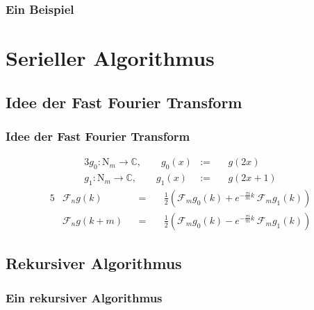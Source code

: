 \documentclass[aspectratio=169]{beamer}
\newcommand{\curvb}[1]{\left( #1 \right)}
\newcommand{\SC}{\mathds{C}} %
\newcommand{\FF}{\mathcal{F}} %
\begin{document}
			\begin{frame}
			\frametitle{Ein Beispiel}
				\begin{figure}
					\center
					
				\end{figure}
			\end{frame}
		


	\section{Serieller Algorithmus} %
	\label{sec:serieller_algorithmus}
	
		\subsection{Idee der Fast Fourier Transform} %
		\label{sub:idee_der_fast_fourier_transform}

			\againframe{dft}

			\begin{frame}
				\frametitle{Idee der Fast Fourier Transform}
				\begin{tcolorbox}[title=Rekursionsformeln der DFT]
					\begin{alignat*}{3}
						g_0:\mathrm{N}_m\longrightarrow\SC,\qquad g_0(x) &:=&& \ g(2x) \\
						g_1:\mathrm{N}_m\longrightarrow\SC,\qquad g_1(x) &:=&& \ g(2x+1)
					\end{alignat*}
					\begin{alignat*}{5}
						&\FF_n g(k) &&=&& \ \frac{1}{2}\curvb{\FF_m g_0(k) + e^{-\frac{\pi i}{m}k} \ \FF_m g_1(k)} \\
						&\FF_n g(k+m) &&=&& \ \frac{1}{2}\curvb{\FF_m g_0(k) - e^{-\frac{\pi i}{m}k} \ \FF_m g_1(k)}
					\end{alignat*}
				\end{tcolorbox}
			\end{frame}


		\subsection{Rekursiver Algorithmus} %
		\label{sub:rekursiver_algorithmus}

			\begin{frame}
				\frametitle{Ein rekursiver Algorithmus}
				\begin{tcolorbox}[breakable, colframe=black,colbacktitle=white,coltitle=black,enhanced, titlerule=0.1pt, boxrule=0.5pt, attach boxed title to top center={yshift=-2mm},enhanced, arc=5pt,title=Listing:\quad rekursiver FFT-Algorithmus Teil 1]
					\scriptsize
					
				\end{tcolorbox}
			\end{frame}
\end{document}
